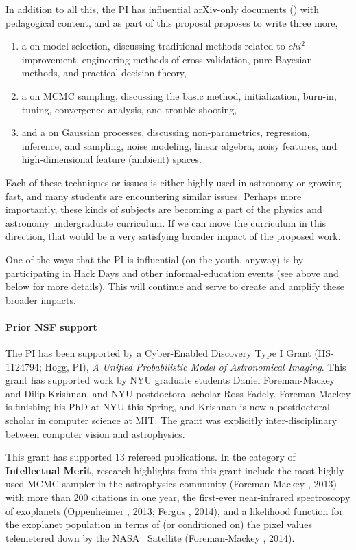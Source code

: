 \documentclass[12pt]{article}
\begin{document}
In addition to all this, the PI has influential arXiv-only documents
() with pedagogical content, and as
part of this proposal proposes to write three more,
\begin{enumerate}
\item
a  on model selection, discussing
traditional methods related to $chi^2$ improvement, engineering
methods of cross-validation, pure Bayesian methods, and practical
decision theory,
\item
a  on MCMC sampling, discussing the
basic method, initialization, burn-in, tuning, convergence analysis,
and trouble-shooting,
\item
and a  on Gaussian processes,
discussing non-parametrics, regression, inference, and sampling, noise
modeling, linear algebra, noisy features, and high-dimensional feature
(ambient) spaces.
\end{enumerate}
Each of these techniques or issues is either highly used in astronomy
or growing fast, and many students are encountering similar issues.
Perhaps more importantly, these kinds of subjects are becoming a part
of the physics and astronomy undergraduate curriculum.
If we can move the curriculum in this direction, that would be a very
satisfying broader impact of the proposed work.

One of the ways that the PI is influential (on the youth, anyway) is
by participating in Hack Days and other informal-education events (see
above and below for more details).  This will continue and serve to
create and amplify these broader impacts.

\paragraph{Prior NSF support}

The PI has been supported by a Cyber-Enabled Discovery Type I Grant
(IIS-1124794; Hogg, PI), \textit{A Unified Probabilistic Model of
  Astronomical Imaging}.
This grant has supported work by NYU graduate students Daniel
Foreman-Mackey and Dilip Krishnan, and NYU postdoctoral scholar Ross
Fadely.
Foreman-Mackey is finishing his PhD at NYU this Spring, and Krishnan
is now a postdoctoral scholar in computer science at MIT.
The grant was explicitly inter-disciplinary between computer vision
and astrophysics.

This grant has supported 13 refereed publications.
In the category of \textbf{Intellectual Merit},
research highlights from this grant include the most highly used MCMC
sampler in the astrophysics community (Foreman-Mackey \etal, 2013)
with more than 200 citations in one year, the
first-ever near-infrared spectroscopy of exoplanets (Oppenheimer \etal, 2013;
Fergus \etal, 2014), and a likelihood function for the exoplanet population
in terms of (or conditioned on) the pixel values telemetered down by
the NASA \kepler\ Satellite (Foreman-Mackey \etal, 2014).
\end{document}
